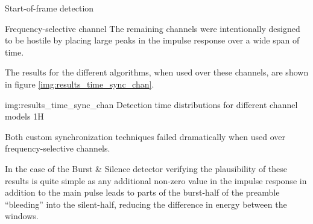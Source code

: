 \begin{subchapter}{Start-of-frame detection}
\begin{subsubchapter}{Frequency-selective channel}
    The remaining channels were intentionally designed to
    be hostile by placing large peaks in the impulse response
    over a wide span of time.

    The results for the different algorithms, when used over these
    channels, are shown in figure \ref{img:results_time_sync_chan}.

                 {img:results_time_sync_chan}
                 {Detection time distributions for different channel models}
                 {1}{H}

    Both custom synchronization techniques failed dramatically
    when used over frequency-selective channels.

    In the case of the Burst \& Silence detector verifying the
    plausibility of these results is quite simple as any
    additional non-zero value in the impulse response in addition
    to the main pulse leads to parts of the burst-half of the
    preamble ``bleeding'' into the silent-half, reducing the
    difference in energy between the windows.
  \end{subsubchapter}
\end{subchapter}

